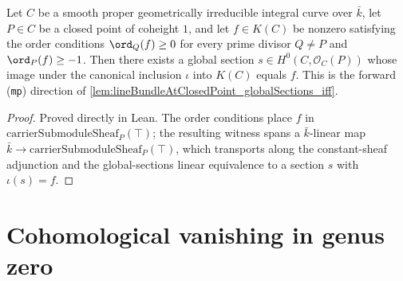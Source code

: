 \begin{lemma}
  \label{lem:lineBundleAtClosedPoint_globalSections_iff_mp}
  Let \(C\) be a smooth proper geometrically irreducible integral curve over
  \(\bar k\), let \(P \in C\) be a closed point of coheight \(1\), and let
  \(f \in K(C)\) be nonzero satisfying the order conditions \(\ord_Q(f) \ge 0\)
  for every prime divisor \(Q \ne P\) and \(\ord_P(f) \ge -1\). Then there
  exists a global section \(s \in H^0(C, \mathcal O_C(P))\) whose image under
  the canonical inclusion \(\iota\) into \(K(C)\) equals \(f\). This is the
  forward (\texttt{mp}) direction of
  \cref{lem:lineBundleAtClosedPoint_globalSections_iff}.
\end{lemma}

\begin{proof}
  Proved directly in Lean. The order conditions place \(f\) in
  \(\mathrm{carrierSubmoduleSheaf}_P(\top)\); the resulting witness spans a
  \(\bar k\)-linear map \(\bar k \to \mathrm{carrierSubmoduleSheaf}_P(\top)\),
  which transports along the constant-sheaf adjunction and the
  global-sections linear equivalence to a section \(s\) with
  \(\iota(s) = f\).
\end{proof}

\section{Cohomological vanishing in genus zero}

